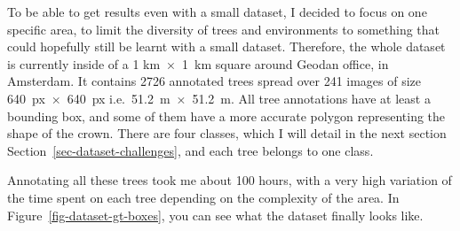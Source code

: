 \documentclass[
  letterpaper,
  DIV=11,
  numbers=noendperiod]{scrartcl}
\begin{document}
To be able to get results even with a small dataset, I decided to focus
on one specific area, to limit the diversity of trees and environments
to something that could hopefully still be learnt with a small dataset.
Therefore, the whole dataset is currently inside of a 1 km~×~1~km square
around Geodan office, in Amsterdam. It contains 2726 annotated trees
spread over 241 images of size 640~px~×~640~px i.e.~51.2~m~×~51.2~m. All
tree annotations have at least a bounding box, and some of them have a
more accurate polygon representing the shape of the crown. There are
four classes, which I will detail in the next section
Section~\ref{sec-dataset-challenges}, and each tree belongs to one
class.

Annotating all these trees took me about 100 hours, with a very high
variation of the time spent on each tree depending on the complexity of
the area. In Figure~\ref{fig-dataset-gt-boxes}, you can see what the
dataset finally looks like.
\end{document}
